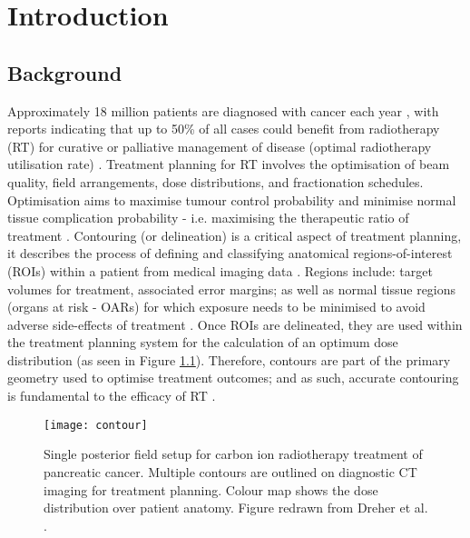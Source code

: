 \chapter{Introduction} \label{ch:introduction}

\section{Background}
Approximately 18 million patients are diagnosed with cancer each year \cite{Bray2019}, with reports indicating that up to 50\% of all cases could benefit from radiotherapy (RT) for curative or palliative management of disease (optimal radiotherapy utilisation rate) \cite{Barton2014}. 
 Treatment planning for RT involves the optimisation of beam quality, field arrangements, dose distributions, and fractionation schedules. Optimisation aims to maximise tumour control probability and minimise normal tissue complication probability - i.e. maximising the therapeutic ratio of treatment \cite{iaea2016}. Contouring (or delineation) is a critical aspect of treatment planning, it describes the process of defining and classifying anatomical regions-of-interest (ROIs) within a patient from medical imaging data \cite{iaea2016}. Regions include: target volumes for treatment, associated error margins; as well as normal tissue regions (organs at risk - OARs) for which exposure needs to be minimised to avoid adverse side-effects of treatment \cite{iaea2016}. Once ROIs are delineated, they are used within the treatment planning system for the calculation of an optimum dose distribution (as seen in Figure \ref{fig:contour}). Therefore, contours are part of the primary geometry used to optimise treatment outcomes; and as such, accurate contouring is fundamental to the efficacy of RT \cite{Nikolov_2018}. 


\begin{figure}[!htb]
	\begin{center}
		\texttt{[image: contour]}
		\caption{Single posterior field setup for carbon ion radiotherapy treatment of pancreatic cancer. Multiple contours are outlined on diagnostic CT imaging for treatment planning. Colour map shows the dose distribution over patient anatomy. Figure redrawn from Dreher et al. \cite{Dreher2017}.}
		\label{fig:contour}
	\end{center}
\end{figure}

